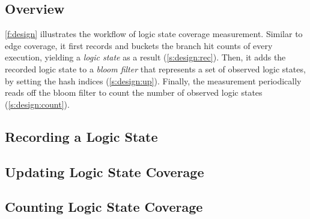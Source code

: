 \documentclass[letterpaper,twocolumn,10pt]{article}
\begin{document}
\subsection{Overview}
\label{s:design:over}


\autoref{f:design} illustrates the workflow of logic state coverage
measurement. Similar to edge coverage, it first records and buckets the branch
hit counts of every execution, yielding a \emph{logic state} as a result 
(\autoref{s:design:rec}). Then, it adds the recorded logic state to a 
\emph{bloom filter} that represents a set of observed logic states, by setting
the hash indices (\autoref{s:design:up}).  Finally, the measurement periodically
reads off the bloom filter to count the number of observed logic states
(\autoref{s:design:count}).


\subsection{Recording a Logic State}
\label{s:design:rec}



\subsection{Updating Logic State Coverage}
\label{s:design:up}



\subsection{Counting Logic State Coverage}
\label{s:design:count}
\end{document}
